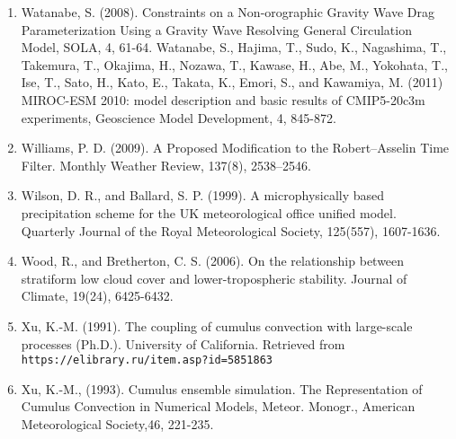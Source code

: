 \begin{enumerate}
\item Watanabe, S. (2008). Constraints on a Non-orographic Gravity Wave Drag Parameterization Using a Gravity Wave Resolving General Circulation Model, SOLA, 4, 61-64.
   Watanabe, S., Hajima, T., Sudo, K., Nagashima, T., Takemura, T., Okajima, H., Nozawa, T., Kawase, H., Abe, M., Yokohata, T., Ise, T., Sato, H., Kato, E., Takata, K., Emori, S., and Kawamiya, M. (2011) MIROC-ESM 2010: model description and basic results of CMIP5-20c3m experiments, Geoscience Model Development, 4, 845-872.
\item Williams, P. D. (2009). A Proposed Modification to the Robert–Asselin Time Filter. Monthly Weather Review, 137(8), 2538–2546.
\item Wilson, D. R., and Ballard, S. P. (1999). A microphysically based precipitation scheme for the UK meteorological office unified model. Quarterly Journal of the Royal Meteorological Society, 125(557), 1607-1636.
\item Wood, R., and Bretherton, C. S. (2006). On the relationship between stratiform low cloud cover and lower-tropospheric stability. Journal of Climate, 19(24), 6425-6432.
\item Xu, K.-M. (1991). The coupling of cumulus convection with large-scale processes (Ph.D.). University of California. Retrieved from \\
\texttt{https://elibrary.ru/item.asp?id=5851863}
\item Xu, K.-M., (1993). Cumulus ensemble simulation. The Representation of Cumulus Convection in Numerical Models, Meteor. Monogr., American Meteorological Society,46, 221-235.
\end{enumerate}
